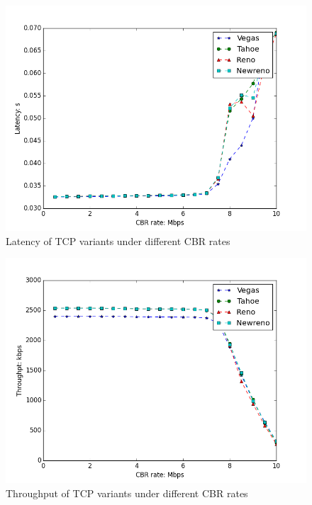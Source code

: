 \documentclass[10pt, conference]{IEEEtran/IEEEtran}
\begin{document}
\begin{figure}[htbp]
\begin{center}
\includegraphics[width=\linewidth]{../exp1/exp1_lat.png}
\caption{Latency of TCP variants under different CBR rates}
\label{exp1_lat}
\end{center}
\end{figure}

\begin{figure}[htbp]
\begin{center}
\includegraphics[width=\linewidth]{../exp1/exp1_thpt.png}
\caption{Throughput of TCP variants under different CBR rates}
\label{exp1_thpt}
\end{center}
\end{figure}
\end{document}
